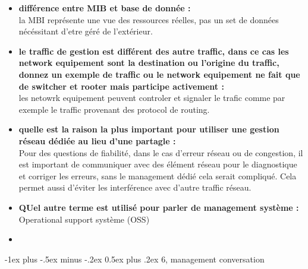 \documentclass[12pt,landscape]{article}
\makeatletter
\renewcommand{\section}{\@startsection{section}{1}{0mm}%
                                {-1ex plus -.5ex minus -.2ex}%
                                {0.5ex plus .2ex}%
                                {\normalfont\large\bfseries}}
\makeatother
\begin{document}
\begin{multicols}{2}
\begin{itemize}
 \item \textbf{différence entre MIB et base de donnée :}\\
 la MBI représente une vue des ressources réelles, pas un set de données nécéssitant d'etre géré de l'extérieur.
 
 \item \textbf{le traffic de gestion est différent des autre traffic, dans ce cas les network equipement sont la destination ou l'origine du traffic, donnez un exemple de traffic ou le network equipement ne fait que de switcher et rooter mais participe activement :}\\
 les netowrk equipement peuvent controler et signaler le trafic comme par exemple le traffic provenant des protocol de routing.
 
 \item \textbf{quelle est la raison la plus important pour utiliser une gestion réseau dédiée au lieu d'une partagle :}\\
 Pour des questions de fiabilité, dans le cas d'erreur réseau ou de congestion, il est important de communiquer avec des élément réseau pour le diagnostique et corriger les erreurs, sans le management dédié cela serait compliqué. Cela permet aussi d'éviter les interférence avec d'autre traffic réseau.
 
 \item \textbf{QUel autre terme est utilisé pour parler de management système :}\\
 Operational support système (OSS)
 
 \item \textbf{}
\end{itemize}




\section{6, management conversation}

\begin{enumerate}


\end{enumerate}
\end{multicols}
\end{document}
